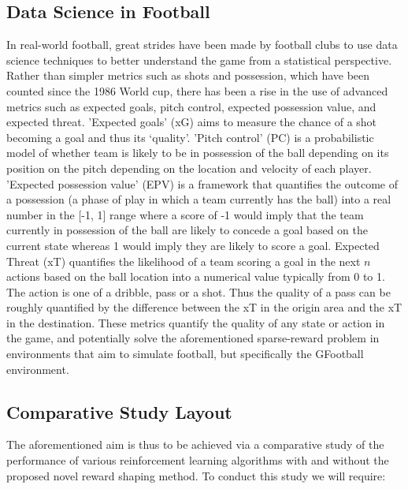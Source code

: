 \documentclass[11pt]{article}
\begin{document}
\subsection{Data Science in Football}
In real-world football, great strides have been made by football clubs to use data science techniques to better understand the game from a statistical perspective. Rather than simpler metrics such as shots and possession, which have been counted since the 1986 World cup, there has been a rise in the use of advanced metrics such as expected goals, pitch control, expected possession value, and expected threat. ’Expected goals’ (xG) \cite{mead2023expected} aims to measure the chance of a shot becoming a goal and thus its ‘quality’. ’Pitch control’ (PC) \cite{Spearman2018} is a probabilistic model of whether team is likely to be in possession of the ball depending on its position on the pitch depending on the location and velocity of each player. 'Expected possession value' (EPV) \cite{Fernandez2021} is a framework that quantifies the outcome of a possession (a phase of play in which a team currently has the ball) into a real number in the [-1, 1] range where a score of -1 would imply that the team currently in possession of the ball are likely to concede a goal based on the current state whereas 1 would imply they are likely to score a goal. Expected Threat (xT) \cite{karun_introducing_2019} quantifies the likelihood of a team scoring a goal in the next $n$ actions based on the ball location into a numerical value typically from 0 to 1. The action is one of a dribble, pass or a shot. Thus the quality of a pass can be roughly quantified by the difference between the xT in the origin area and the xT in the destination. These metrics quantify the quality of any state or action in the game, and potentially solve the aforementioned sparse-reward problem in environments that aim to simulate football, but specifically the GFootball environment.

\subsection{Comparative Study Layout}
The aforementioned aim is thus to be achieved via a comparative study of the performance of various reinforcement learning algorithms with and without the proposed novel reward shaping method. To conduct this study we will require:
\end{document}
